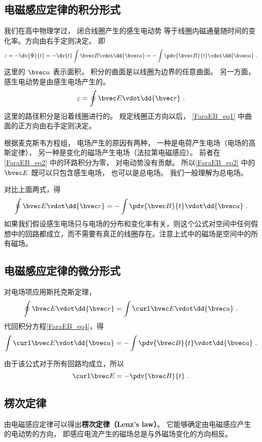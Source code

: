 
\begin{issues}
\issueAbstract
\issueTODO
\end{issues}


\subsection{电磁感应定律的积分形式}

我们在高中物理学过， 闭合线圈产生的感生电动势 %
等于线圈内磁通量随时间的变化率。方向由右手定则决定。 即
\begin{equation}\label{FaraEB_eq1}
\varepsilon  =  -\dv{\Phi}{t} =  - \dv{t} \int \bvec B \vdot \dd{\bvec a} =  - \int \pdv{\bvec B}{t} \vdot \dd{\bvec a}~.
\end{equation} 
这里的 $\bvec a$ 表示面积， 积分的曲面是以线圈为边界的任意曲面。 另一方面，感生电动势是由感生电场产生的。 
\begin{equation}\label{FaraEB_eq2}
\varepsilon  = \oint \bvec E \vdot \dd{\bvec r}~.
\end{equation}
这里的路径积分是沿着线圈进行的。 规定线圈正方向以后， \autoref{FaraEB_eq1} 中曲面的正方向由右手定则决定。

根据麦克斯韦方程组， 电场产生的原因有两种， 一种是电荷产生电场（电场的高斯定律）， 另一种是变化的磁场产生电场（法拉第电磁感应）。 前者在\autoref{FaraEB_eq2} 中的环路积分为零， 对电动势没有贡献。 所以\autoref{FaraEB_eq2} 中的 $\bvec E$ 既可以只包含感生电场， 也可以是总电场。 我们一般理解为总电场。

对比上面两式，得
\begin{equation}\label{FaraEB_eq4}
\oint \bvec E \vdot \dd{\bvec r}  =  - \int \pdv{\bvec B}{t} \vdot \dd{\bvec a} ~.
\end{equation} 
如果我们假设感生电场只与电场的分布和变化率有关，则这个公式对空间中任何假想中的回路都成立，而不需要有真正的线圈存在。注意上式中的磁场是空间中的所有磁场。

\subsection{电磁感应定律的微分形式}

对电场项应用斯托克斯定理， 
\begin{equation}
\oint \bvec E \vdot \dd{\bvec r}  = \int \curl \bvec E \vdot \dd{\bvec a}~.
\end{equation}
代回积分方程\autoref{FaraEB_eq4}，得
\begin{equation}
\int \curl \bvec E \vdot\dd{\bvec a}  =  - \int \pdv{\bvec B}{t} \vdot \dd{\bvec a} ~.
\end{equation} 

由于该公式对于所有回路均成立，所以
\begin{equation}\label{FaraEB_eq3}
\curl \bvec E =  - \pdv{\bvec B}{t}~.
\end{equation} 

\subsection{楞次定律}
由电磁感应定律可以得出\textbf{楞次定律（Lenz's law）}。 它能够确定由电磁感应产生的电动势的方向， 即感应电流产生的磁场总是与外磁场变化的方向相反。 
